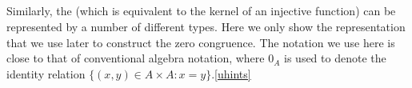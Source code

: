 \begin{code}
\AgdaSpace{}%
\AgdaSpace{}%
\AgdaSpace{}%
\<%
\\
%
\>[1]\AgdaSpace{}%
\AgdaSpace{}%
\AgdaSymbol{=}\AgdaSpace{}%
\AgdaSpace{}%
\AgdaSpace{}%
\AgdaSpace{}%
\AgdaSpace{}%
\AgdaFunction{,}\AgdaSpace{}%
\AgdaSpace{}%
\AgdaSpace{}%
\AgdaSpace{}%
\AgdaSpace{}%
\AgdaFunction{,}\AgdaSpace{}%
\AgdaSpace{}%
\AgdaSpace{}%
\AgdaSpace{}%
\AgdaSpace{}%
\<%
\\
%
\\[\AgdaEmptyExtraSkip]%
%
\>[1]\AgdaSpace{}%
\AgdaSymbol{:}\AgdaSpace{}%
\AgdaSymbol{(}\AgdaSpace{}%
\AgdaSpace{}%
\AgdaSymbol{)}\AgdaSpace{}%
\AgdaSpace{}%
\AgdaSpace{}%
\AgdaSpace{}%
\AgdaSpace{}%
\<%
\\
%
\>[1]\AgdaSpace{}%
\AgdaSpace{}%
\AgdaSymbol{=}\AgdaSpace{}%
\AgdaSpace{}%
\AgdaSpace{}%
\AgdaBound{,}\AgdaSpace{}%
\AgdaSpace{}%
\AgdaSpace{}%
\AgdaSymbol{(}\AgdaSpace{}%
\AgdaSpace{}%
\AgdaSymbol{)}\AgdaSpace{}%
\AgdaFunction{,}\AgdaSpace{}%
\AgdaSpace{}%
\AgdaSpace{}%
\AgdaSpace{}%
\AgdaSpace{}%
\<%
\end{code}
\ccpad
Similarly, the  (which is equivalent to the kernel of an injective function) can be represented by a number of different types. Here we only show the representation that we use later to construct the zero congruence. The notation we use here is close to that of conventional algebra notation, where $0_A$ is used to denote the identity relation $\{(x, y) \in A \times A : x = y\}$.\cref{uhints}
\ccpad
